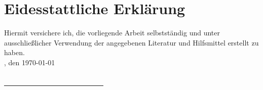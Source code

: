 \chapter{Eidesstattliche Erklärung}
\label{ch:erklaerung}

Hiermit versichere ich, die vorliegende Arbeit selbstständig und unter
ausschließlicher Verwendung der angegebenen Literatur und Hilfsmittel erstellt zu haben.
\vspace*{2em}
\\
\myLocation, den \today \\\\

\underline{\ \ \ \ \ \ \ \ \ \ \ \ \ \ \ \ \ \ \ \ \ \ \ \ \ \ \ \ }\\\\
\small{\myName}
